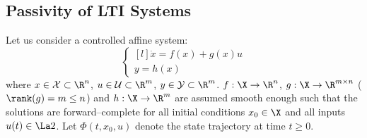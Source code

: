 \subsection{Passivity of LTI Systems}
%
%
%
Let us consider a controlled affine system:
\begin{equation}\label{eq:nlaffine}
    \left\{
    \begin{matrix*}[l]
        \dot{x} = f(x) + g(x)u\\
        y = h(x)
    \end{matrix*}
    \right.
\end{equation}
where $x\in\mathcal{X}\subset\R^n$, $u\in\mathcal{U}\subset\R^m$, $y\in\mathcal{Y}\subset\R^m$. $f:\X\rightarrow\R^n$, $g:\X\rightarrow\R^{m\times n}$ ($\rank(g)= m\leq n$) and $h:\X\rightarrow\R^m$ are assumed smooth enough such that the solutions are forward--complete for all initial conditions $x_0\in\X$ and all inputs $u(t)\in\La2$. Let $\Phi(t,x_0,u)$ denote the state trajectory at time $t\geq0$.

